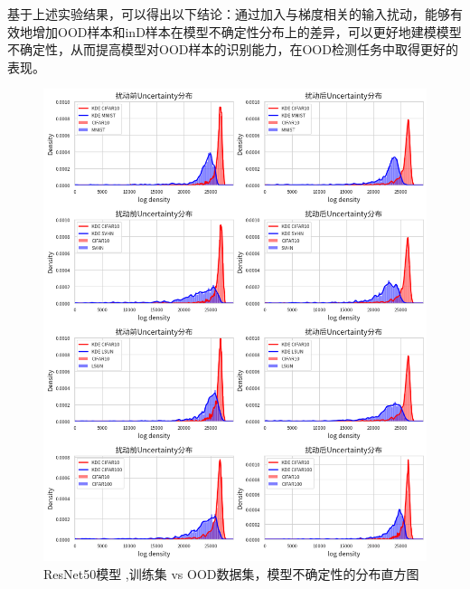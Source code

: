 基于上述实验结果，可以得出以下结论：通过加入与梯度相关的输入扰动，能够有效地增加OOD样本和inD样本在模型不确定性分布上的差异，可以更好地建模模型不确定性，从而提高模型对OOD样本的识别能力，在OOD检测任务中取得更好的表现。



\begin{figure}[htbp]
    \vspace{-1pt} %
    \centering
    \includegraphics[width=\linewidth]{assets/combined_vertical_image.png}
    \vspace{-1pt} %
    \caption{ResNet50模型 ,训练集 vs OOD数据集，模型不确定性的分布直方图}
    \label{tag:uncertainty 1}
\end{figure}



